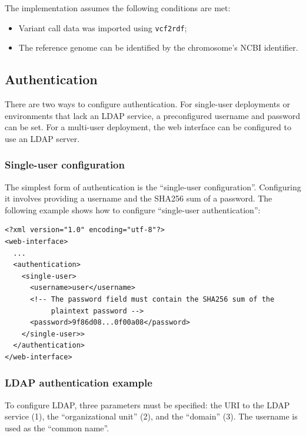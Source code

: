   The implementation assumes the following conditions are met:
  \begin{itemize}
  \item Variant call data was imported using \texttt{vcf2rdf};
  \item The reference genome can be identified by the chromosome's NCBI
    identifier.
  \end{itemize}

\subsection{Authentication}
\label{sec:authentication}

  There are two ways to configure authentication.  For single-user deployments
  or environments that lack an LDAP service, a preconfigured username and
  password can be set.  For a multi-user deployment, the web interface can be
  configured to use an LDAP server.

\subsubsection{Single-user configuration}

  The simplest form of authentication is the ``single-user configuration''.
  Configuring it involves providing a username and the SHA256 sum of a password.
  The following example shows how to configure ``single-user authentication'':

\begin{siderules}
\begin{verbatim}
<?xml version="1.0" encoding="utf-8"?>
<web-interface>
  ...
  <authentication>
    <single-user>
      <username>user</username>
      <!-- The password field must contain the SHA256 sum of the
           plaintext password -->
      <password>9f86d08...0f00a08</password>
    </single-user>>
  </authentication>
</web-interface>
\end{verbatim}
\end{siderules}

\subsubsection{LDAP authentication example}

  To configure LDAP, three parameters must be specified: the URI to the LDAP
  service (1), the ``organizational unit'' (2), and the ``domain'' (3).  The
  username is used as the ``common name''.

